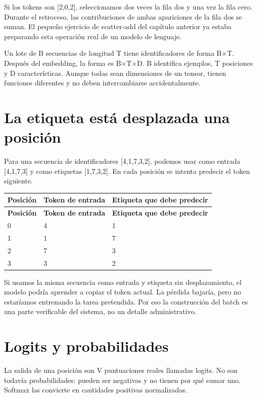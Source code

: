 \documentclass[12pt,a4paper,oneside]{report}
\begin{document}
Si los tokens son [2,0,2], seleccionamos dos veces la fila dos y una vez la fila cero. Durante el retroceso, las contribuciones de ambas apariciones de la fila dos se suman. El pequeño ejercicio de scatter-add del capítulo anterior ya estaba preparando esta operación real de un modelo de lenguaje.

Un lote de B secuencias de longitud T tiene identificadores de forma B\ensuremath{\times}T. Después del embedding, la forma es B\ensuremath{\times}T\ensuremath{\times}D. B identifica ejemplos, T posiciones y D características. Aunque todas sean dimensiones de un tensor, tienen funciones diferentes y no deben intercambiarse accidentalmente.

\section{La etiqueta está desplazada una posición}
Para una secuencia de identificadores [4,1,7,3,2], podemos usar como entrada [4,1,7,3] y como etiquetas [1,7,3,2]. En cada posición se intenta predecir el token siguiente.

{\small
\begin{longtable}{@{}P{0.28\textwidth}P{0.32\textwidth}P{0.34\textwidth}@{}}
\toprule
\textbf{Posición} & \textbf{Token de entrada} & \textbf{Etiqueta que debe predecir}\\
\midrule
\endfirsthead
\toprule
\textbf{Posición} & \textbf{Token de entrada} & \textbf{Etiqueta que debe predecir}\\
\midrule
{} & 4 & 1\\
1 & 1 & 7\\
2 & 7 & 3\\
3 & 3 & 2\\
\bottomrule
\end{longtable}
}
Si usamos la misma secuencia como entrada y etiqueta sin desplazamiento, el modelo podría aprender a copiar el token actual. La pérdida bajaría, pero no estaríamos entrenando la tarea pretendida. Por eso la construcción del batch es una parte verificable del sistema, no un detalle administrativo.

\section{Logits y probabilidades}
La salida de una posición son V puntuaciones reales llamadas logits. No son todavía probabilidades: pueden ser negativas y no tienen por qué sumar uno. Softmax las convierte en cantidades positivas normalizadas.
\end{document}
